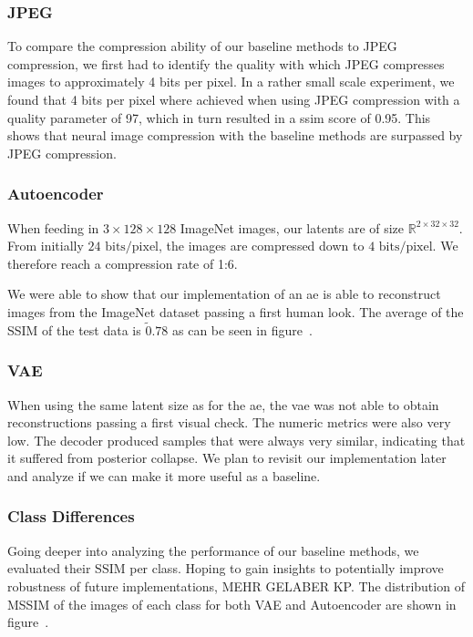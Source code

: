 \subsubsection{JPEG}\label{subsubsec:jpeg} %
To compare the compression ability of our baseline methods to JPEG compression, we first had to identify the quality with which JPEG compresses images to approximately 4 bits per pixel.
In a rather small scale experiment, we found that 4 bits per pixel where achieved when using JPEG compression with a quality parameter of 97, which in turn resulted in a \ac{ssim} score of 0.95.
This shows that neural image compression with the baseline methods are surpassed by JPEG compression. 

\subsubsection{Autoencoder}\label{subsubsec:autoencoder}
When feeding in $3 \times 128 \times 128$ ImageNet images, our latents are of size $\mathbb{R}^{2\times 32 \times 32}$.
From initially $24\text{ bits/pixel}$, the images are compressed down to $4\text{ bits/pixel}$.
We therefore reach a compression rate of 1:6.

We were able to show that our implementation of an \ac{ae} is able to reconstruct images from the ImageNet dataset
passing a first human look.
The average of the SSIM of the test data is $\tilde0.78$ as can be seen in figure~\cite{citationNeeded}.

\subsubsection{VAE}\label{subsubsec:vae_training}
When using the same latent size as for the \ac{ae}, the \ac{vae} was not able to obtain reconstructions
passing a first visual check.
The numeric metrics were also very low.
The decoder produced samples that were always very similar, indicating that it suffered from posterior collapse.
We plan to revisit our implementation later and analyze if we can make it more useful as a baseline.

\subsubsection{Class Differences}\label{subsubsec:class-differences}
Going deeper into analyzing the performance of our baseline methods, we evaluated their SSIM per class.
Hoping to gain insights to potentially improve robustness of future implementations, MEHR GELABER KP.
The distribution of MSSIM of the images of each class for both VAE and Autoencoder are shown in figure~\cite{citationNeeded}.

